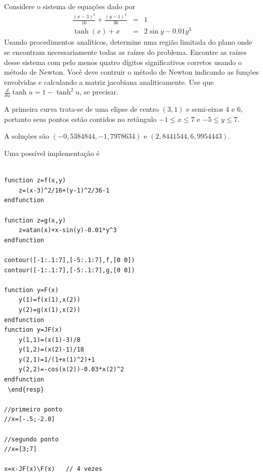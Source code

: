 \begin{exer} Considere o sistema de equações dado por
\begin{eqnarray*}
\frac{(x-3)^2}{16}+\frac{(y-1)^2}{36}&=&1\\
\tanh(x)+x&=&2\sin y-0.01y^3
\end{eqnarray*}
Usando procedimentos analíticos, determine uma região limitada do plano onde se encontram necessariamente todas as raízes do problema.
Encontre as raízes desse sistema com pelo menos quatro dígitos significativos corretos usando o método de Newton. Você deve contruir o método de Newton indicando as funções envolvidas e calculando a matriz jacobiana analiticamente. Use que $\frac{d}{du}\tanh u = 1-\tanh^2u$, se precisar.
\end{exer}
\begin{resp}
 A primeira curva trata-se de uma elipse de centro $(3,1)$ e semi-eixos 4 e 6, portanto seus pontos estão contidos no retângulo $-1\leq x \leq 7$ e $-5\leq y \leq 7$. 

A soluções são $\left( -0,5384844 , -1,7978634\right)$ e $\left(2,8441544, 6,9954443\right)$.

\ifisscilab
Uma possível implementação é
\begin{verbatim}
    
function z=f(x,y)
    z=(x-3)^2/16+(y-1)^2/36-1
endfunction

function z=g(x,y)
    z=atan(x)+x-sin(y)-0.01*y^3
endfunction

contour([-1:.1:7],[-5:.1:7],f,[0 0])
contour([-1:.1:7],[-5:.1:7],g,[0 0])
    
function y=F(x)
    y(1)=f(x(1),x(2))
    y(2)=g(x(1),x(2))
endfunction
function y=JF(x)
    y(1,1)=(x(1)-3)/8
    y(1,2)=(x(2)-1)/18
    y(2,1)=1/(1+x(1)^2)+1
    y(2,2)=-cos(x(2))-0.03*x(2)^2
endfunction    
 \end{resp}
    
//primeiro ponto
//x=[-.5;-2.0]

//segundo ponto
//x=[3;7]

x=x-JF(x)\F(x)   // 4 vezes
\end{verbatim}
\fi
\end{resp}



